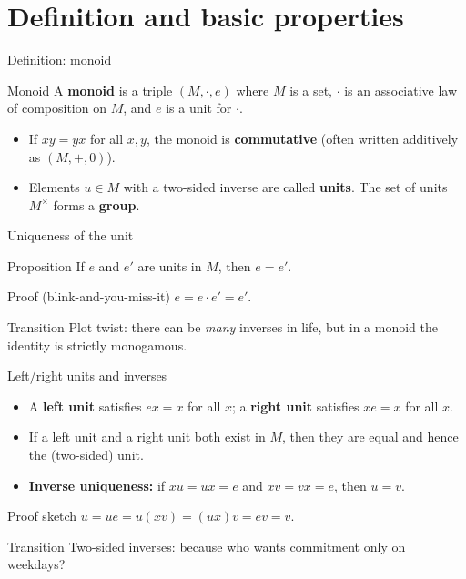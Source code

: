 \documentclass[aspectratio=169,11pt]{beamer}
\begin{document}
\section{Definition and basic properties}
\begin{frame}{Definition: monoid}
\begin{block}{Monoid}
A \textbf{monoid} is a triple $(M,\cdot,e)$ where $M$ is a set, $\cdot$ is an associative law of composition on $M$, and $e$ is a unit for $\cdot$.
\end{block}
\begin{itemize}
  \item If $xy=yx$ for all $x,y$, the monoid is \textbf{commutative} (often written additively as $(M,+,0)$).
  \item Elements $u\in M$ with a two-sided inverse are called \textbf{units}. The set of units $M^\times$ forms a \textbf{group}.
\end{itemize}
\end{frame}

\begin{frame}{Uniqueness of the unit}
\begin{block}{Proposition}
If $e$ and $e'$ are units in $M$, then $e=e'$.
\end{block}
\begin{block}{Proof (blink-and-you-miss-it)}
$e=e\cdot e'=e'$.
\end{block}
\begin{block}{Transition}
Plot twist: there can be \emph{many} inverses in life, but in a monoid the identity is strictly monogamous.
\end{block}
\end{frame}

\begin{frame}{Left/right units and inverses}
\begin{itemize}
  \item A \textbf{left unit} satisfies $ex=x$ for all $x$; a \textbf{right unit} satisfies $xe=x$ for all $x$.
  \item If a left unit and a right unit both exist in $M$, then they are equal and hence the (two-sided) unit.
  \item \textbf{Inverse uniqueness:} if $xu=ux=e$ and $xv=vx=e$, then $u=v$.
\end{itemize}
\begin{block}{Proof sketch}
$u=ue= u(xv)=(ux)v=ev=v$.
\end{block}
\begin{block}{Transition}
Two-sided inverses: because who wants commitment only on weekdays?
\end{block}
\end{frame}
\end{document}
